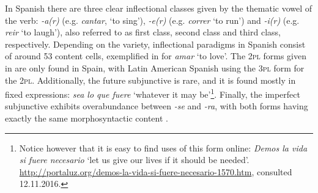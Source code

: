 In Spanish there are three clear inflectional classes given by the thematic vowel of the verb: \textit{-a(r)} (e.g. \textit{cantar}, `to sing'), \textit{-e(r)} (e.g. \textit{correr} `to run') and \textit{-i(r)} (e.g. \textit{reir} `to laugh'), also referred to as first class, second class and third class, respectively. Depending on the variety, inflectional paradigms in Spanish consist of around 53 content cells, exemplified in  for \textit{amar} `to love'. The \textsc{2pl} forms given in  are only found in Spain, with Latin American Spanish using the \textsc{3pl} form for the \textsc{2pl}. Additionally, the future subjunctive is rare, and it is found mostly in fixed expressions: \textit{sea lo que fuere} `whatever it may be'\footnote{Notice however that it is easy to find uses of this form online: \textit{Demos la vida si fuere necesario} `let us give our lives if it should be needed'. \url{http://portaluz.org/demos-la-vida-si-fuere-necesario-1570.htm}, consulted 12.11.2016.}. Finally, the imperfect subjunctive exhibits overabundance \autocites{Thornton.2010a, Thornton.2010} between \textit{-se} and \textit{-ra}, with both forms having exactly the same morphosyntactic content \autocites{Cuervo.1981, DeMello.1993, Kempas.2011, Rojo.2008, Schwenter.2013}.
